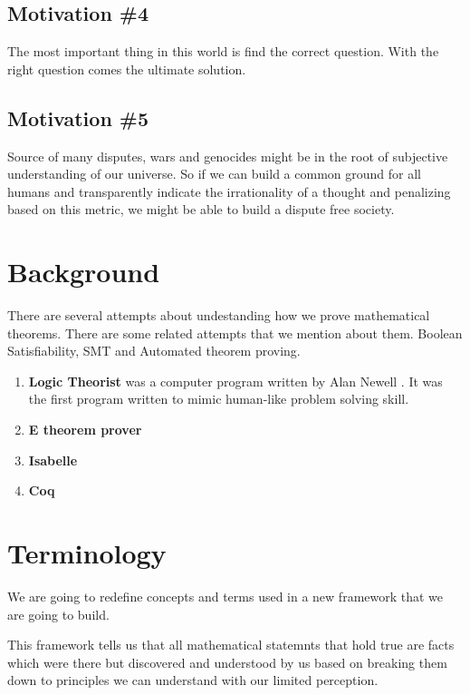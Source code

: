 \documentclass{article}
\begin{document}
\subsection{Motivation \#4} 
The most important thing in this world is find the correct question. With the right question comes the ultimate solution.


\subsection{Motivation \#5} 

Source of many disputes, wars and genocides might be in the root of subjective understanding of our universe. So if we can build a common ground for all humans and transparently indicate the irrationality of a thought and penalizing based on this metric, we might be able to build a dispute free society.



\section{Background}

There are several attempts about undestanding how we prove mathematical theorems. There are some related attempts that we mention about them. Boolean Satisfiability, SMT and Automated theorem proving.

\begin{enumerate}

\item \textbf{Logic Theorist} was a computer program written by Alan Newell . It was the first program written to mimic human-like problem solving skill. 

\item \textbf{E theorem prover}

\item \textbf{Isabelle}


\item \textbf{Coq}

\end{enumerate}



\section{Terminology}

We are going to redefine concepts and terms used in a new framework that we are going to build.

This framework tells us that all mathematical statemnts that hold true are facts which were there but discovered and understood by us based on breaking them down to principles we can understand with our limited perception.
\end{document}
